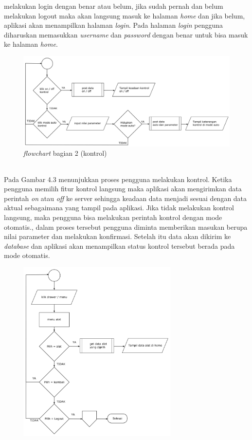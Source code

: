 \begin{flushleft}
\begin{justify}
\begin{enumerate}[label=\alph*.]
            melakukan login dengan benar atau belum, jika sudah pernah dan belum melakukan logout maka akan langsung masuk ke halaman \emph{home} dan jika belum, aplikasi akan menampilkan halaman \emph{login}. Pada halaman \emph{login} pengguna diharuskan memasukkan \emph{username} dan \emph{password} dengan benar untuk bisa masuk ke halaman \emph{home}.
            \vspace{8cm}
            \begin{figure}[ht]
                \centering
                \includegraphics[width=12cm]{images/bab 4/fc-kontrol.png}
                \caption{\textit{flowchart} bagian 2 (kontrol)}
            \end{figure}
            \\Pada Gambar 4.3 menunjukkan proses pengguna melakukan kontrol. Ketika pengguna memilih fitur kontrol langsung maka aplikasi akan mengirimkan data perintah \emph{on} atau \emph{off}
            ke server sehingga keadaan data menjadi sesuai dengan data aktual sebagaimana yang tampil pada aplikasi. 
            Jika tidak melakukan kontrol langsung, maka pengguna bisa melakukan perintah kontrol dengan mode otomatis., dalam proses tersebut pengguna diminta memberikan masukan berupa nilai parameter dan melakukan konfirmasi. Setelah itu data akan dikirim ke \emph{database} dan aplikasi akan menampilkan status kontrol tersebut berada pada mode otomatis.
            \begin{figure}[ht]
                \centering
                \includegraphics[width=8cm]{images/bab 4/fc-pilih alat.png}

\end{figure}
\end{enumerate}
\end{justify}
\end{flushleft}
